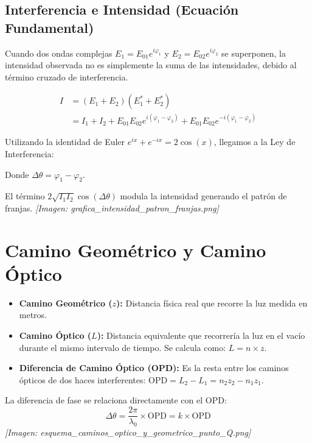 \documentclass[12pt]{article}
\begin{document}
	\subsection{Interferencia e Intensidad (Ecuación Fundamental)}
	Cuando dos ondas complejas $E_1 = E_{01}e^{i\varphi_1}$ y $E_2 = E_{02}e^{i\varphi_2}$ se superponen, la intensidad observada no es simplemente la suma de las intensidades, debido al término cruzado de interferencia.
	
	\begin{align*}
		I &= (E_1 + E_2)(E_1^* + E_2^*) \\
		&= I_1 + I_2 + E_{01}E_{02}e^{i(\varphi_1 - \varphi_2)} + E_{01}E_{02}e^{-i(\varphi_1 - \varphi_2)}
	\end{align*}
	
	Utilizando la identidad de Euler $e^{ix} + e^{-ix} = 2\cos(x)$, llegamos a la Ley de Interferencia:
	\begin{center}
	\end{center}
	Donde $\Delta\theta = \varphi_1 - \varphi_2$.
	
	El término $2\sqrt{I_1 I_2}\cos(\Delta\theta)$ modula la intensidad generando el patrón de franjas.
	\textit{[Imagen: grafica\_intensidad\_patron\_franjas.png]}
	
	\section{Camino Geométrico y Camino Óptico}
	
	\begin{itemize}
		\item \textbf{Camino Geométrico ($z$):} Distancia física real que recorre la luz medida en metros.
		\item \textbf{Camino Óptico ($L$):} Distancia equivalente que recorrería la luz en el vacío durante el mismo intervalo de tiempo. Se calcula como: $L = n \times z$.
		\item \textbf{Diferencia de Camino Óptico (OPD):} Es la resta entre los caminos ópticos de dos haces interferentes: $\text{OPD} = L_2 - L_1 = n_2z_2 - n_1z_1$.
	\end{itemize}
	
	La diferencia de fase se relaciona directamente con el OPD:
	\begin{equation*}
		\Delta\theta = \frac{2\pi}{\lambda_0} \times \text{OPD} = k \times \text{OPD}
	\end{equation*}
	\textit{[Imagen: esquema\_caminos\_optico\_y\_geometrico\_punto\_Q.png]}
	
\end{document}
